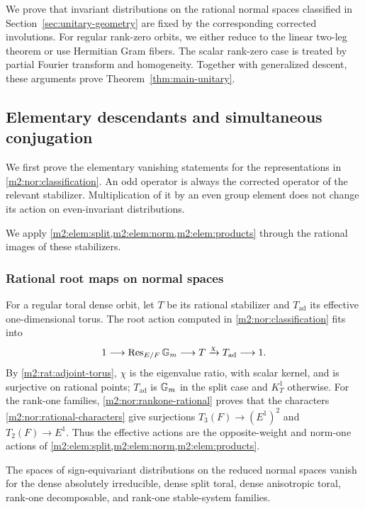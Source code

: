We prove that invariant distributions on the rational normal spaces
classified in Section~\ref{sec:unitary-geometry} are fixed by the
corresponding corrected involutions. For regular rank-zero orbits,
we either reduce to the linear two-leg theorem or use Hermitian
Gram fibers. The scalar rank-zero case is treated by partial Fourier
transform and homogeneity. Together with generalized descent,
these arguments prove Theorem~\ref{thm:main-unitary}.

\subsection{Elementary descendants and simultaneous conjugation}
\label{m2:sec:elementary}

We first prove the elementary vanishing statements for the
representations in \cref{m2:nor:classification}. An odd
operator is always the corrected operator of the relevant
stabilizer. Multiplication of it by an even group element does not
change its action on even-invariant distributions.

We apply \cref{m2:elem:split,m2:elem:norm,m2:elem:products}
through the rational images of these stabilizers.

\subsubsection{Rational root maps on normal spaces}

For a regular toral dense orbit, let $T$ be its rational
stabilizer and $T_{\mathrm{ad}}$ its effective one-dimensional
torus. The root action computed in \cref{m2:nor:classification}
fits into
\begin{equation}\label{m2:elem:rootsequence}
 1\longrightarrow\operatorname{Res}_{E/F}\mathbb G_m\longrightarrow T
 \xrightarrow{\chi}T_{\mathrm{ad}}\longrightarrow1.
\end{equation}
By \cref{m2:rat:adjoint-torus}, $\chi$ is the eigenvalue ratio,
with scalar kernel, and is surjective on rational points;
$T_{\mathrm{ad}}$ is $\mathbb G_m$ in the split case and $K_T^1$ otherwise.
For the rank-one families, \cref{m2:nor:rankone-rational}
proves that the characters \eqref{m2:nor:rational-characters}
give surjections $T_3(F)\to(E^1)^2$ and $T_2(F)\to E^1$.
Thus the effective actions are the opposite-weight and
norm-one actions of \cref{m2:elem:split,m2:elem:norm,m2:elem:products}.

\begin{proposition}\label{m2:elem:vanishing}
The spaces of sign-equivariant distributions on the reduced normal
spaces vanish for the dense absolutely
irreducible, dense split toral, dense anisotropic toral,
rank-one decomposable, and rank-one stable-system families.
\end{proposition}


